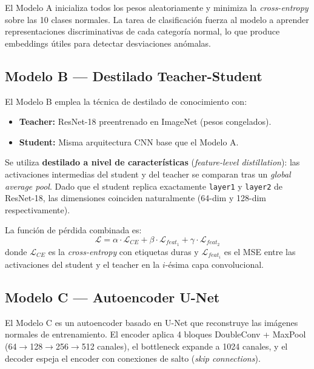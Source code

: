 \documentclass[conference]{IEEEtran}
\begin{document}
El Modelo A inicializa todos los pesos aleatoriamente y minimiza la
\textit{cross-entropy} sobre las 10 clases normales. La tarea de clasificación
fuerza al modelo a aprender representaciones discriminativas de cada categoría
normal, lo que produce embeddings útiles para detectar desviaciones anómalas.

\subsection{Modelo B — Destilado Teacher-Student}

El Modelo B emplea la técnica de destilado de conocimiento
\cite{hinton2015distilling} con:

\begin{itemize}
  \item \textbf{Teacher:} ResNet-18 preentrenado en ImageNet (pesos congelados).
  \item \textbf{Student:} Misma arquitectura CNN base que el Modelo A.
\end{itemize}

Se utiliza \textbf{destilado a nivel de características} (\textit{feature-level
distillation}): las activaciones intermedias del student y del teacher se
comparan tras un \textit{global average pool}. Dado que el student replica
exactamente \texttt{layer1} y \texttt{layer2} de ResNet-18, las dimensiones
coinciden naturalmente (64-dim y 128-dim respectivamente).

La función de pérdida combinada es:
\begin{equation}
  \mathcal{L} = \alpha \cdot \mathcal{L}_{CE} + \beta \cdot \mathcal{L}_{feat_1}
              + \gamma \cdot \mathcal{L}_{feat_2}
\end{equation}
donde $\mathcal{L}_{CE}$ es la \textit{cross-entropy} con etiquetas duras y
$\mathcal{L}_{feat_i}$ es el MSE entre las activaciones del student y el teacher
en la $i$-ésima capa convolucional.

\subsection{Modelo C — Autoencoder U-Net}

El Modelo C es un autoencoder basado en U-Net \cite{ronneberger2015unet} que
reconstruye las imágenes normales de entrenamiento. El encoder aplica 4 bloques
DoubleConv + MaxPool (64$\rightarrow$128$\rightarrow$256$\rightarrow$512 canales),
el bottleneck expande a 1024 canales, y el decoder espeja el encoder con conexiones
de salto (\textit{skip connections}).
\end{document}

